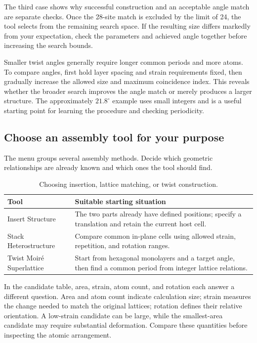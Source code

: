 The third case shows why successful construction and an acceptable angle match are separate checks. Once the 28-site match is excluded by the limit of 24, the tool selects from the remaining search space. If the resulting size differs markedly from your expectation, check the parameters and achieved angle together before increasing the search bounds.

Smaller twist angles generally require longer common periods and more atoms. To compare angles, first hold layer spacing and strain requirements fixed, then gradually increase the allowed size and maximum coincidence index. This reveals whether the broader search improves the angle match or merely produces a larger structure. The approximately $21.8^\circ$ example uses small integers and is a useful starting point for learning the procedure and checking periodicity.

\subsection{Choose an assembly tool for your purpose}

The  menu groups several assembly methods. Decide which geometric relationships are already known and which ones the tool should find.

\begin{table}[htbp]
\centering
\caption{Choosing insertion, lattice matching, or twist construction.}
\begin{tabularx}{\linewidth}{lX}
\toprule
Tool & Suitable starting situation\\
\midrule
Insert Structure & The two parts already have defined positions; specify a translation and retain the current host cell.\\
Stack Heterostructure & Compare common in-plane cells using allowed strain, repetition, and rotation ranges.\\
Twist Moiré Superlattice & Start from hexagonal monolayers and a target angle, then find a common period from integer lattice relations.\\
\bottomrule
\end{tabularx}
\end{table}

In the  candidate table, area, strain, atom count, and rotation each answer a different question. Area and atom count indicate calculation size; strain measures the change needed to match the original lattices; rotation defines their relative orientation. A low-strain candidate can be large, while the smallest-area candidate may require substantial deformation. Compare these quantities before inspecting the atomic arrangement.

